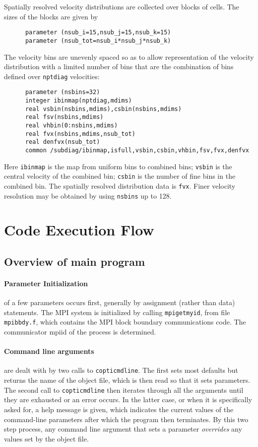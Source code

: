 \documentclass[12pt]{article}
\begin{document}
Spatially resolved velocity distributions are collected over blocks of
cells. The sizes of the blocks are given by 
\begin{verbatim}
      parameter (nsub_i=15,nsub_j=15,nsub_k=15)
      parameter (nsub_tot=nsub_i*nsub_j*nsub_k)
\end{verbatim}
The velocity bins are unevenly spaced so as to allow representation
of the velocity distribution with a limited number of bins that are
the combination of bins defined over \verb!nptdiag! velocities:
\begin{verbatim}
      parameter (nsbins=32)
      integer ibinmap(nptdiag,mdims)
      real vsbin(nsbins,mdims),csbin(nsbins,mdims)
      real fsv(nsbins,mdims)
      real vhbin(0:nsbins,mdims)
      real fvx(nsbins,mdims,nsub_tot)
      real denfvx(nsub_tot)
      common /subdiag/ibinmap,isfull,vsbin,csbin,vhbin,fsv,fvx,denfvx
\end{verbatim}
Here \verb!ibinmap! is the map from uniform bins to combined bins;
\verb!vsbin! is the central velocity of the combined bin; \verb!csbin!
is the number of fine bins in the combined bin. The spatially resolved
distribution data is \verb!fvx!. Finer velocity resolution may be
obtained by using \verb!nsbins! up to 128.

\section{Code Execution Flow}

\subsection{Overview of main program}

\paragraph{Parameter Initialization} of a few parameters occurs
first, generally by assignment (rather than data) statements. The MPI
system is initialized by calling \verb!mpigetmyid!, from file
\verb!mpibbdy.f!, which contains the MPI block boundary communications
code. The communicator mpiid of the process is determined.

\paragraph{Command line arguments} are dealt with by two calls to
\verb!copticmdline!. The first sets most defaults but returns the name
of the object file, which is then read so that it sets parameters.
The second call to \verb!copticmdline! then iterates through all the
arguments until they are exhausted or an error occurs. In the latter case,
or when it is specifically asked for, a help message is given, which
indicates the current values of the command-line parameters after
which the program then terminates. By this two step process, any
command line argument that sets a parameter \emph{overrides} any
values set by the object file.
\end{document}
